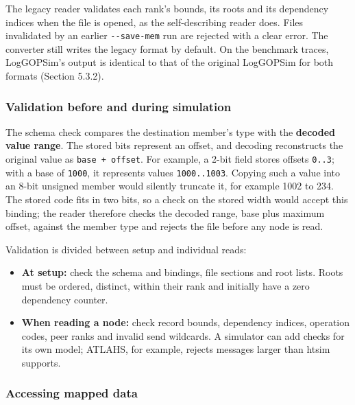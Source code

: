 \documentclass[10pt,a4paper]{article}
\begin{document}
The legacy reader validates each rank's bounds, its roots and its dependency indices when the file is opened, as the self-describing reader does. Files invalidated by an earlier \texttt{-\allowbreak{}-\allowbreak{}save-\allowbreak{}mem} run are rejected with a clear error. The converter still writes the legacy format by default. On the benchmark traces, LogGOPSim's output is identical to that of the original LogGOPSim for both formats (Section 5.3.2).

\hypertarget{validation-before-and-during-simulation}{}
\subsubsection{Validation before and during simulation}

The schema check compares the destination member's type with the \textbf{decoded value range}. The stored bits represent an offset, and decoding reconstructs the original value as \texttt{base + offse\allowbreak{}t}. For example, a 2-bit field stores offsets \texttt{0.\allowbreak{}.\allowbreak{}3}; with a base of \texttt{1000}, it represents values \texttt{1000.\allowbreak{}.\allowbreak{}1003}. Copying such a value into an 8-bit unsigned member would silently truncate it, for example 1002 to 234. The stored code fits in two bits, so a check on the stored width would accept this binding; the reader therefore checks the decoded range, base plus maximum offset, against the member type and rejects the file before any node is read.

Validation is divided between setup and individual reads:

\begin{itemize}
\item \textbf{At setup:} check the schema and bindings, file sections and root lists. Roots must be ordered, distinct, within their rank and initially have a zero dependency counter.
\item \textbf{When reading a node:} check record bounds, dependency indices, operation codes, peer ranks and invalid send wildcards. A simulator can add checks for its own model; ATLAHS, for example, rejects messages larger than htsim supports.
\end{itemize}

\hypertarget{accessing-mapped-data}{}
\subsubsection{Accessing mapped data}
\end{document}
